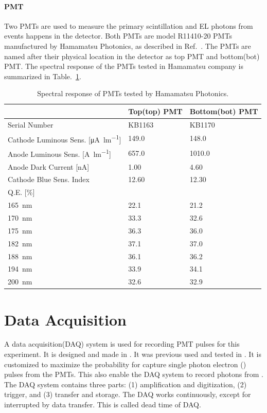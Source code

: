 \paragraph{PMT} %
Two PMTs are used to measure the primary scintillation and EL photons from events happens in the detector. Both PMTs are model R11410-20 PMTs manufactured by Hamamatsu Photonics, as described in Ref.~\cite{HamamatsuPhotonics2006}. The PMTs are named after their physical location in the detector as top PMT and bottom(bot) PMT. The spectral response of the PMTs tested in Hamamatsu company is summarized in Table.~\ref{tab:PMTparameterHamamatsu}.

\begin{center} 
\centering
 \begin{table}
    	\centering
\begin{tabular}[!tb]{ | m{16em} ||m{9em} | m{9em}| } 
 \hline
 &Top(top) PMT&Bottom(bot) PMT\\\hline\hline
 Serial Number & KB1163 & KB1170 \\\hline
 Cathode Luminous Sens. [\si{\uA\per\lumen}] & 149.0 & 148.0 \\\hline
 Anode Luminous Sens. [\si{\A\per\lumen}] & 657.0 & 1010.0 \\\hline
 Anode Dark Current [\si{\nA}] & 1.00 & 4.60 \\\hline
 Cathode Blue Sens. Index  & 12.60 & 12.30 \\\hline
 Q.E. [\si{\percent}] & &  \\\hline
 \quad \quad \SI{165}{\nm} & 22.1 & 21.2 \\\hline
 \quad \quad \SI{170}{\nm} & 33.3 & 32.6 \\\hline
 \quad \quad \SI{175}{\nm} & 36.3 & 36.0 \\\hline
 \quad \quad \SI{182}{\nm} & 37.1 & 37.0 \\\hline
 \quad \quad \SI{188}{\nm} & 36.1 & 36.2 \\\hline
 \quad \quad \SI{194}{\nm} & 33.9 & 34.1 \\\hline
 \quad \quad \SI{200}{\nm}& 32.6 & 32.9 \\\hline	
\end{tabular}
 \caption[Spectral response of PMTs tested by Hamamatsu Photonics]{Spectral response of PMTs tested by Hamamatsu Photonics.}
 \label{tab:PMTparameterHamamatsu}  
 \end{table}
\end{center} 

\section{Data Acquisition} %
A data acquisition(DAQ) system is used for recording PMT pulses for this experiment. It is designed and made in \slac . It was previous used and tested in \phaseone . It is customized to maximize the probability for capture single photon electron (\sphe ) pulses from the PMTs. This also enable the DAQ system to record photons from \eep . The DAQ system contains three parts: (1) amplification and digitization, (2) trigger, and (3) transfer and storage. The DAQ works continuously, except for interrupted by data transfer. This is called dead time of DAQ. %

